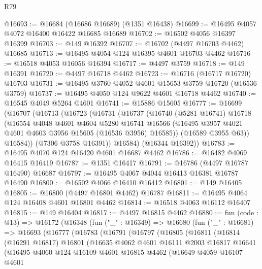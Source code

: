 \begin{lexlean}{R79}
\begin{coremodule}
@16693 := @16684 (@16686 @16689) (@1351 @16438)
@16699 := @16495 @4057 @4072 @16400 @16422 @16685 @16689
@16702 := @16502 @4056 @16397 @16399
@16703 := @149 @16392
@16707 := @16702 (@4497 @16703 @4462) @16685
@16713 := @16495 @4054 @124 @16395 @4601 @16703 @4462
@16716 := @16518 @4053 @16056 @16394
@16717 := @4497 @3759
@16718 := @149 @16391
@16720 := @4497 @16718 @4462
@16723 := @16716 (@16717 @16720) @16703
@16731 := @16495 @3760 @4052 @4601 @15653 @3759 @16720 (@16536 @3759)
@16737 := @16495 @4050 @124 @9622 @4601 @16718 @4462
@16740 := @16545 @4049 @5264 @4601
@16741 := @15886 @15605
@16777 := @16699
    (@16707
      (@16713
        (@16723
          (@16731
            (@16737
              (@16740
                (@5281 @16741)
                @16718
                (@16554
                  @4048
                  @4601
                  @4604
                  @5280
                  @16741
                  @16566
                  (@16495 @3957 @4021 @4601 @4603 @3956 @15605 (@16536 @3956) @16585))
                (@16589 @3955 @63))
              @16584))
          (@7306 @3758 @16391))
        @16584)
      (@16344 @16392))
@16783 := @16495 @4070 @124 @16420 @4601 @16687 @4462
@16786 := @16482 @4069 @16415 @16419
@16787 := @1351 @16417
@16791 := @16786 (@4497 @16787 @16490) @16687
@16797 := @16495 @4067 @4044 @16413 @16381 @16787 @16490
@16800 := @16502 @4066 @16410 @16412
@16801 := @149 @16405
@16805 := @16800 (@4497 @16801 @4462) @16787
@16811 := @16495 @4064 @124 @16408 @4601 @16801 @4462
@16814 := @16518 @4063 @16112 @16407
@16815 := @149 @16404
@16817 := @4497 @16815 @4462
@16880 := fun (code : @13) =>
  @16172
    (@16348
      (fun ("_" : @16349) =>
      @16680
        (fun ("_" : @16681) =>
        @16693
          (@16777
            (@16783
              (@16791
                (@16797
                  (@16805
                    (@16811
                      (@16814
                        (@16291 @16817)
                        @16801
                        (@16635
                          @4062
                          @4601
                          @16111
                          @2003
                          @16817
                          @16641
                          (@16495
                            @4060
                            @124
                            @16109
                            @4601
                            @16815
                            @4462
                            (@16649
                              @4059
                              @16107
                              @4601

\end{coremodule}
\end{lexlean}
